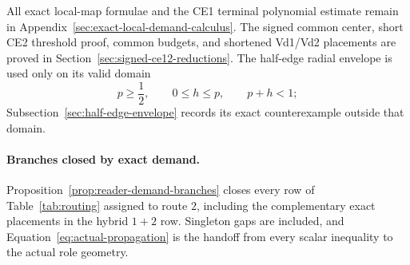 All exact local-map formulae and the CE1 terminal polynomial estimate remain
in Appendix~\ref{sec:exact-local-demand-calculus}. The signed common center,
short CE2 threshold proof, common budgets, and shortened Vd1/Vd2 placements
are proved in Section~\ref{sec:signed-ce12-reductions}. The half-edge radial
envelope is used only on its valid domain
\[
 p\ge\frac12,\qquad0\le h\le p,\qquad p+h<1;
\]
Subsection~\ref{sec:half-edge-envelope} records its exact counterexample
outside that domain.

\paragraph{Branches closed by exact demand.}
Proposition~\ref{prop:reader-demand-branches} closes every row of
Table~\ref{tab:routing} assigned to route $2$, including the complementary
exact placements in the hybrid $1+2$ row. Singleton gaps are included, and
Equation~\eqref{eq:actual-propagation} is the handoff from every scalar
inequality to the actual role geometry.
